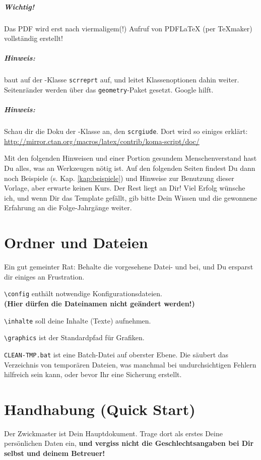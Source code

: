 \subparagraph*{Wichtig!} Das PDF wird erst nach viermaligem(!) Aufruf von PDFLaTeX (per TeXmaker) vollständig erstellt! 

\subparagraph*{Hinweis:}  \midx{\zwicktex} baut auf der -Klasse \texttt{scrreprt} auf, und leitet Klassenoptionen dahin weiter. Seitenränder werden über das \texttt{geometry}-Paket gesetzt. Google hilft.

\subparagraph*{Hinweis:}  Schau dir die Doku der -Klasse an, den \verb|scrgiude|. Dort wird so einiges erklärt: \\
\url{http://mirror.ctan.org/macros/latex/contrib/koma-script/doc/}

Mit den folgenden Hinweisen und einer Portion gesundem Menschenverstand hast Du alles, was an Werkzeugen nötig ist. Auf den folgenden Seiten findest Du dann noch Beispiele (s. Kap. \ref{kap:beispiele}) und Hinweise zur Benutzung dieser Vorlage, aber erwarte keinen \latex Kurs.
Der Rest liegt an Dir! Viel Erfolg wünsche ich, und wenn Dir das Template gefällt, gib bitte Dein Wissen und die gewonnene Erfahrung an die Folge-Jahrgänge weiter.


\section*{Ordner und Dateien}
Ein gut gemeinter Rat: Behalte die vorgesehene Datei- und  bei, und Du ersparst dir einiges an Frustration.

\verb|\config| enthält notwendige Konfigurationsdateien. \\
\textbf{(Hier dürfen die Dateinamen nicht geändert werden!)}

\verb|\inhalte| soll deine Inhalte (Texte) aufnehmen.

\verb|\graphics| ist der Standardpfad für Grafiken.

\verb|CLEAN-TMP.bat| ist eine Batch-Datei auf oberster Ebene. Die säubert das Verzeichnis von temporären Dateien, was manchmal bei undurchsichtigen Fehlern hilfreich sein kann, oder bevor Ihr eine Sicherung erstellt.


\section*{Handhabung (Quick Start)}
Der Zwickmaster ist Dein Hauptdokument. Trage dort als erstes Deine persönlichen Daten ein, \textbf{und vergiss nicht die Geschlechtsangaben bei Dir selbst und deinem Betreuer!}

